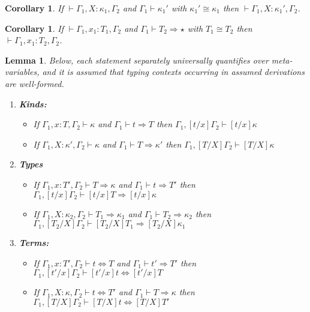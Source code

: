 \documentclass{article}
\newcommand{\tpsynth}[0]{\Rightarrow}
\newtheorem{lemma}[theorem]{Lemma}
\newtheorem{corollary}[theorem]{Corollary}
\begin{document}
\begin{corollary}
  \label{cor:ctxt-conv-class}
  If \(\vdash \Gamma_1,X:\kappa_1,\Gamma_2\) and \(\Gamma_1 \vdash \kappa_1'\)
  with \(\kappa_1' \cong \kappa_1\) then \(\vdash \Gamma_1,X:\kappa_1',\Gamma_2\).
\end{corollary}

\begin{corollary}
  \label{cor:ctxt-conv-class2}
  If \(\vdash \Gamma_1,x_1:T_1,\Gamma_2\) and \(\Gamma_1 \vdash T_2 \tpsynth
  \star\) with \(T_1 \cong T_2\) then \(\vdash \Gamma_1,x_1:T_2,\Gamma_2\).
\end{corollary}

\begin{lemma}
  \label{lem:subst-class}
  Below, each statement separately universally quantifies over meta-variables,
  and it is assumed that typing contexts occurring in assumed derivations are
  well-formed.
  \begin{enumerate}
  \item \textbf{Kinds:}
    \begin{itemize}
    \item If \(\Gamma_1,x:T,\Gamma_2 \vdash \kappa\) and \(\Gamma_1 \vdash t
      \tpsynth T\) then \(\Gamma_1,[t/x]\Gamma_2 \vdash [t/x] \kappa\)
      
    \item If \(\Gamma_1,X:\kappa',\Gamma_2 \vdash \kappa\) and \(\Gamma_1 \vdash
      T \tpsynth \kappa'\) then \(\Gamma_1,[T/X]\Gamma_2 \vdash [T/X]\kappa\)
    \end{itemize}
    
  \item \textbf{Types}
    \begin{itemize}
    \item If \(\Gamma_1,x:T',\Gamma_2 \vdash T \tpsynth \kappa\) and \(\Gamma_1 \vdash t
      \tpsynth T'\) then \(\Gamma_1,[t/x]\Gamma_2 \vdash [t/x]T \tpsynth [t/x]\kappa\)
      
    \item If \(\Gamma_1,X:\kappa_2,\Gamma_2 \vdash T_1 \tpsynth \kappa_1\) and \(\Gamma_1
      \vdash T_2 \tpsynth \kappa_2\) then \(\Gamma_1,[T_2/X]\Gamma_2 \vdash [T_2/X]T_1 \tpsynth [T_2/X]\kappa_1\)
    \end{itemize}
    
  \item \textbf{Terms:}
    \begin{itemize}
    \item If \(\Gamma_1,x:T',\Gamma_2 \vdash t \Leftrightarrow T\) and
      \(\Gamma_1 \vdash t' \tpsynth T'\) then \(\Gamma_1,[t'/x]\Gamma_2 \vdash [t'/x]t
      \Leftrightarrow [t'/x]T\)
     
    \item If \(\Gamma_1,X:\kappa,\Gamma_2 \vdash t \Leftrightarrow T'\) and
      \(\Gamma_1 \vdash T \tpsynth \kappa\) then \(\Gamma_1,[T/X]\Gamma_2 \vdash
      [T/X]t \Leftrightarrow [T/X]T'\)
    \end{itemize}
  \end{enumerate}
\end{lemma}
\end{document}

